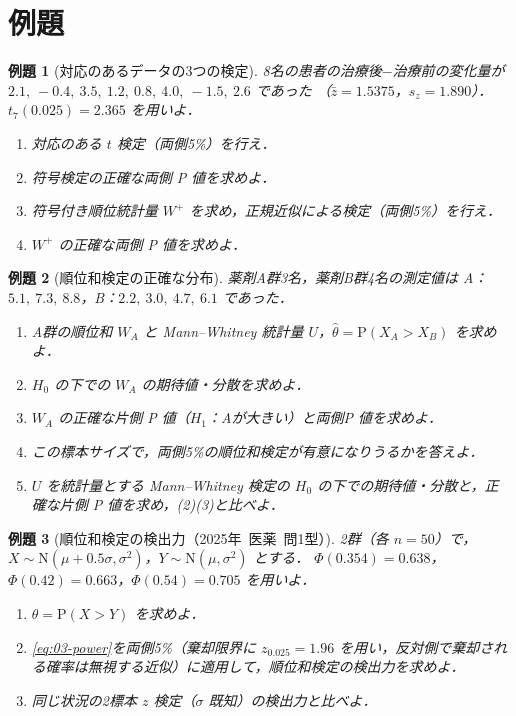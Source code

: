 \documentclass[a4paper,11pt,openany]{ltjsbook}
\newtheorem{reidai}{例題}[chapter]
\newcommand{\kakomon}[2]{\mbox{#1年 医薬 問#2}}
\newcommand{\Prob}{\mathrm{P}}
\newcommand{\Normal}{\mathrm{N}}
\begin{document}
\section{例題}\label{sec:03-ex}
\begin{reidai}[対応のあるデータの3つの検定]\label{reidai:03-1}
8名の患者の治療後$-$治療前の変化量が
$2.1,\ -0.4,\ 3.5,\ 1.2,\ 0.8,\ 4.0,\ -1.5,\ 2.6$ であった
（$\bar z=1.5375$，$s_z=1.890$）．$t_7(0.025)=2.365$ を用いよ．
\begin{enumerate}[label=(\arabic*)]
\item 対応のある $t$ 検定（両側5\%）を行え．
\item 符号検定の正確な両側 P 値を求めよ．
\item 符号付き順位統計量 $W^+$ を求め，正規近似による検定（両側5\%）を行え．
\item $W^+$ の正確な両側 P 値を求めよ．
\end{enumerate}
\end{reidai}

\begin{reidai}[順位和検定の正確な分布]\label{reidai:03-2}
薬剤A群3名，薬剤B群4名の測定値は A：$5.1,\ 7.3,\ 8.8$，B：$2.2,\ 3.0,\ 4.7,\ 6.1$ であった．
\begin{enumerate}[label=(\arabic*)]
\item A群の順位和 $W_A$ と Mann--Whitney 統計量 $U$，$\hat\theta=\widehat{\Prob}(X_A>X_B)$ を求めよ．
\item $H_0$ の下での $W_A$ の期待値・分散を求めよ．
\item $W_A$ の正確な片側 P 値（$H_1$：Aが大きい）と両側P 値を求めよ．
\item この標本サイズで，両側5\%の順位和検定が有意になりうるかを答えよ．
\item $U$ を統計量とする Mann--Whitney 検定の $H_0$ の下での期待値・分散と，正確な片側 P 値を求め，(2)(3)と比べよ．
\end{enumerate}
\end{reidai}

\begin{reidai}[順位和検定の検出力（\kakomon{2025}{1}型）]\label{reidai:03-3}
2群（各 $n=50$）で，$X\sim\Normal(\mu+0.5\sigma,\sigma^2)$，$Y\sim\Normal(\mu,\sigma^2)$ とする．
$\Phi(0.354)=0.638$，$\Phi(0.42)=0.663$，$\Phi(0.54)=0.705$ を用いよ．
\begin{enumerate}[label=(\arabic*)]
\item $\theta=\Prob(X>Y)$ を求めよ．
\item \cref{eq:03-power}を両側5\%（棄却限界に $z_{0.025}=1.96$ を用い，反対側で棄却される確率は無視する近似）に適用して，順位和検定の検出力を求めよ．
\item 同じ状況の2標本 $z$ 検定（$\sigma$ 既知）の検出力と比べよ．
\end{enumerate}
\end{reidai}
\end{document}
